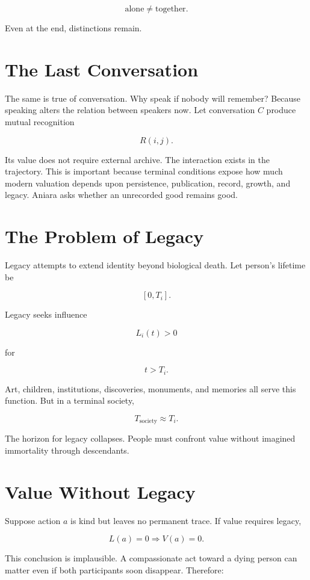 \documentclass[11pt,oneside]{book}
\theoremstyle{definition}
\theoremstyle{remark}
\begin{document}
\[
\text{alone} \neq \text{together}.
\]

Even at the end, distinctions remain.

\section{The Last Conversation}

The same is true of conversation. Why speak if nobody will remember? Because speaking alters the
relation between speakers now. Let conversation \(C\) produce mutual recognition

\[
R(i,j).
\]

Its value does not require external archive. The interaction exists in the trajectory. This is
important because terminal conditions expose how much modern valuation depends upon persistence,
publication, record, growth, and legacy. Aniara asks whether an unrecorded good remains good.

\section{The Problem of Legacy}

Legacy attempts to extend identity beyond biological death. Let person's lifetime be

\[
[0,T_i].
\]

Legacy seeks influence

\[
L_i(t)>0
\]

for

\[
t>T_i.
\]

Art, children, institutions, discoveries, monuments, and memories all serve this function. But in a
terminal society,

\[
T_{\mathrm{society}} \approx T_i.
\]

The horizon for legacy collapses. People must confront value without imagined immortality through
descendants.

\section{Value Without Legacy}

Suppose action \(a\) is kind but leaves no permanent trace. If value requires legacy,

\[
L(a)=0 \Rightarrow V(a)=0.
\]

This conclusion is implausible. A compassionate act toward a dying person can matter even if both
participants soon disappear. Therefore:
\end{document}
